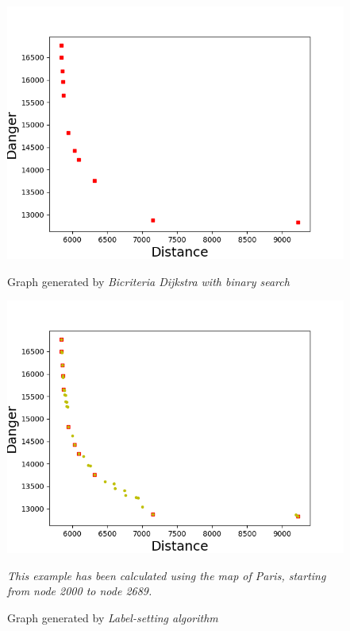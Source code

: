 \documentclass[a4paper,11pt]{report}
\begin{document}
\begin{figure}[H]
	\centering
	\begin{minipage}[b]{0.49\textwidth}
		\includegraphics[width=\textwidth, trim= 0 0 15mm 14mm, clip]{img/graphDijkstraBicrit.png}
		\caption{Graph generated by \textit{Bicriteria Dijkstra with binary search}}
		\label{fig:graphBiDi}
	\end{minipage}
	\hfill
	\begin{minipage}[b]{0.49\textwidth}
		\includegraphics[width=\textwidth, trim= 0 0 15mm 14mm, clip]{img/graphLabelsetting.png}
		\caption{Graph generated by \textit{Label-setting algorithm}}
		\label{fig:graphLabSet}
	\end{minipage}
\textit{{\tiny This example has been calculated using the map of Paris, starting from node 2000 to node 2689.}}
\end{figure}
\end{document}
